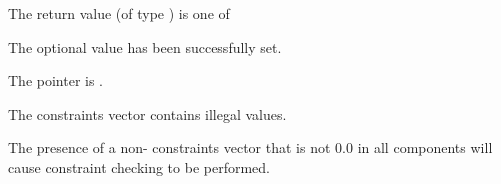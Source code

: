 {{\begin{args}
\begin{itemize}
    \end{itemize}
  \end{args}
}
{
  The return value  (of type ) is one of
  \begin{args}
  \item[\Id{IDA\_SUCCESS}] 
    The optional value has been successfully set.
  \item[\Id{IDA\_MEM\_NULL}]
    The  pointer is .
  \item[\Id{IDA\_ILL\_INPUT}]
    The constraints vector contains illegal values.
  \end{args}
}
{
  The presence of a non- constraints vector that is not $0.0$ in
  all components will cause constraint checking to be performed.
}

}
